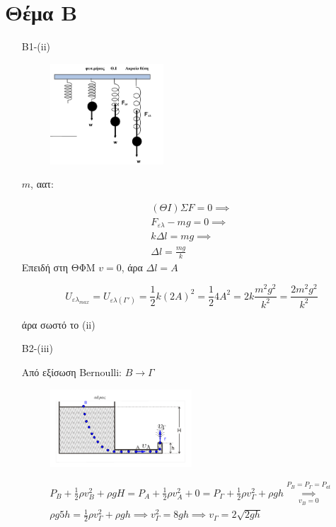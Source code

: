 \documentclass[12pt]{article}
\begin{document}
  \section*{Θέμα Β}
  \begin{enumerate}
    \item [B1-(ii)]

    \begin{figure}[h]
      \includegraphics[width=0.4\textwidth]{ΦυσικήΒ1.png}
      \centering
    \end{figure}

    $m$, αατ:

    \begin{gather*}
    (ΘΙ) ΣF=0 \implies \\ F_{ελ}-mg=0 \implies \\ kΔl=mg \implies \\ Δl=\frac{mg}{k}
    \end{gather*}
    Επειδή στη ΘΦΜ $v=0$, άρα $Δl=A$



    $$U_{ελ_{max}}= U_{ελ(Γ')}=\frac{1}{2}k\left(2A\right)^2=\frac{1}{2}4A^2=2k\frac{m^2g^2}{k^2}=\frac{2m^2g^2}{k^2}$$

    άρα σωστό το (ii)

    \item [B2-(iii)]

    Από εξίσωση Bernoulli: $Β\to Γ$
    \begin{figure}[h]
      \includegraphics[width=0.5\textwidth]{ΦυσικήΒ2.png}
      \centering
    \end{figure}

    \begin{gather*}
      P_B + \frac{1}{2}ρv_Β^2+ρgH=P_Α+\frac{1}{2}ρv_Α^2+0=
      P_Γ+\frac{1}{2}ρv_Γ^2+ρgh\overset{P_Β=P_Γ=P_{at}}{\underset{v_Β=0}{\implies}}\\
      ρg5h=\frac{1}{2}ρv_Γ^2+ρgh\implies v_Γ^2=8gh\implies v_Γ=2\sqrt{2gh}
    \end{gather*}


\end{enumerate}
\end{document}
